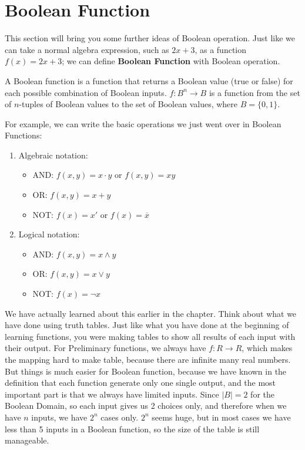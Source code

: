     \section{Boolean Function}
    This section will bring you some further ideas of Boolean operation. Just like we can take a normal algebra
    expression, such as $2x+3$, as a function $f(x)=2x+3$; we can define \textbf{Boolean Function}
    with Boolean operation.
    \begin{definition}
    A Boolean function is a function that returns a Boolean value (true or false) for each possible combination of Boolean inputs. 
    $f: B^n \rightarrow B$ is a function from the set of  $n$-tuples of Boolean values to the set of Boolean values, where  $B = \{0, 1\}$.
    \end{definition} 
    For example, we can write the basic operations we just went over in Boolean Functions:
    \begin{enumerate}
        \item Algebraic notation:
        \begin{itemize}
            \item AND: $f(x, y) = x \cdot y$ or $f(x, y) = xy$
            \item OR: $f(x, y) = x + y$
            \item NOT: $f(x) = x'$ or $f(x) = \overline{x}$
        \end{itemize}
        
        \item Logical notation:
        \begin{itemize}
            \item AND: $f(x, y) = x \wedge y$
            \item OR: $f(x, y) = x \vee y$
            \item NOT: $f(x) = \neg x$
        \end{itemize}
    \end{enumerate}

    We have actually learned about this earlier in the chapter. Think about what we have done using truth tables. Just like what you have done at the beginning of 
    learning functions, you were making tables to show all results of each input with their output. For Preliminary functions, we always have 
    $f: R\rightarrow R$, which makes the mapping hard to make table, because there are infinite many real numbers. But things is much easier for Boolean function,
    because we have known in the definition that each function generate only one single output, and the most important part is that we always have limited inputs.
    Since $|B|=2$ for the Boolean Domain, so each input gives us 2 choices only, and therefore when we have $n$ inputs, we have $2^n$ cases only. $2^n$ seems huge,
    but in most cases we have less than 5 inputs in a Boolean function, so the size of the table is still manageable.

